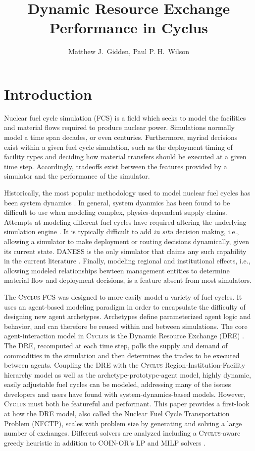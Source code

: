 \documentclass{anstrans}
\title{Dynamic Resource Exchange Performance in Cyclus}
\author{Matthew J.~Gidden, Paul P. H.~Wilson}
\institute{
University of Wisconsin, Madison WI
}
\newcommand{\Cyclus}{\textsc{Cyclus}}
\begin{document}
\section{Introduction}
Nuclear fuel cycle simulation (FCS) is a field which seeks to model the
facilities and material flows required to produce nuclear power. Simulations
normally model a time span decades, or even centuries. Furthermore, myriad
decisions exist within a given fuel cycle simulation, such as the deployment
timing of facility types and deciding how material transfers should be executed
at a given time step. Accordingly, tradeoffs exist between the features provided
by a simulator and the performance of the simulator.

Historically, the most popular methodology used to model nuclear fuel cycles has
been system dynamics \cite{moisseytsev_dymond_2001, durpel_daness_2003,
  yacout_vision_2006, busquim_e_silva_system_2008}. In general, system dyanmics
has been found to be difficult to use when modeling complex, physics-dependent
supply chains. Attempts at modeling different fuel cycles have required altering
the underlying simulation engine \cite{guerin_impact_2009}. It is typically
difficult to add \textit{in situ} decision making, i.e., allowing a simulator to
make deployment or routing decisions dynamically, given its current
state. DANESS is the only simulator that claims any such capability in the
current literature \cite{van_den_durpel_daness_2009}. Finally, modeling regional
and institutional effects, i.e., allowing modeled relationships bewteen
management entities to determine material flow and deployment decisions, is a
feature absent from most simulators. 

The \Cyclus{} FCS \cite{cyclus2014} was designed to more easily model a variety
of fuel cycles. It uses an agent-based modeling paradigm in order to encapsulate
the difficulty of designing new agent archetypes. Archetypes define
parameterized agent logic and behavior, and can therefore be reused within and
between simulations. The core agent-interaction model in \Cyclus{} is the
Dynamic Resource Exchange (DRE) \cite{gidden_agent-based_2013,
  gidden_agent-based_2014}. The DRE, recomputed at each time step, polls the
supply and demand of commodities in the simulation and then determines the
trades to be executed between agents. Coupling the DRE with the \Cyclus{}
Region-Institution-Facility hierarchy model as well as the
archetype-prototype-agent model, highly dynamic, easily adjustable fuel cycles
can be modeled, addressing many of the issues developers and users have found
with system-dynamics-based models. However, \Cyclus{} must both be featureful
and performant. This paper provides a first-look at how the DRE model, also
called the Nuclear Fuel Cycle Transportation Problem (NFCTP), scales with
problem size by generating and solving a large number of exchanges. Different
solvers are analyzed including a \Cyclus{}-aware greedy heuristic in addition to
COIN-OR's LP and MILP solvers \cite{coinclp, coincbc}.
\end{document}
